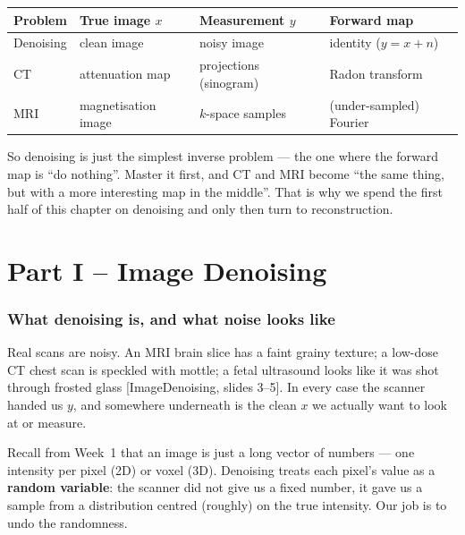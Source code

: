 \documentclass[11pt]{article}
\newcommand{\deck}[1]{\textsf{\small[#1]}}
\begin{document}
\begin{center}
\begin{tabular}{@{}llll@{}}
\toprule
Problem & True image $x$ & Measurement $y$ & Forward map \\
\midrule
Denoising      & clean image            & noisy image          & identity ($y = x + n$) \\
CT             & attenuation map        & projections (sinogram) & Radon transform \\
MRI            & magnetisation image    & $k$-space samples    & (under-sampled) Fourier \\
\bottomrule
\end{tabular}
\end{center}

So denoising is just the simplest inverse problem --- the one where the forward
map is ``do nothing''. Master it first, and CT and MRI become ``the same thing,
but with a more interesting map in the middle''. That is why we spend the first
half of this chapter on denoising and only then turn to reconstruction.

\part*{Part I -- Image Denoising}

\section{What denoising is, and what noise looks like}

Real scans are noisy. An MRI brain slice has a faint grainy texture; a low-dose
CT chest scan is speckled with mottle; a fetal ultrasound looks like it was
shot through frosted glass \deck{ImageDenoising, slides 3--5}. In every case the
scanner handed us $y$, and somewhere underneath is the clean $x$ we actually
want to look at or measure.

Recall from Week~1 that an image is just a long vector of numbers --- one
intensity per pixel (2D) or voxel (3D). Denoising treats each pixel's value as
a \textbf{random variable}: the scanner did not give us a fixed number, it gave
us a sample from a distribution centred (roughly) on the true intensity. Our
job is to undo the randomness.
\end{document}
